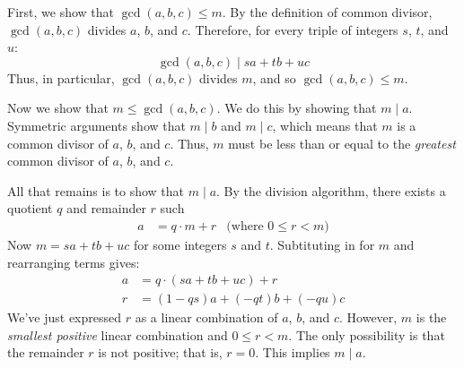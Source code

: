 \documentclass[12pt,twoside]{article}
\begin{document}
\begin{problem}{20}
{    First, we show that $\gcd(a, b, c) \leq m$.  By the definition of
    common divisor, $\gcd(a, b, c)$ divides $a$, $b$, and $c$.  Therefore,
    for every triple of integers $s$, $t$, and $u$:
    \[
    \gcd(a, b, c) \mid s a + t b + u c
    \]
    Thus, in particular, $\gcd(a, b, c)$ divides $m$, and so $\gcd(a, b,
    c) \leq m$.

    Now we show that $m \leq \gcd(a, b, c)$.  We do this by showing
    that $m \mid a$.  Symmetric arguments show that $m \mid b$
    and $m \mid c$, which means that $m$ is a common divisor of
    $a$, $b$, and $c$.  Thus, $m$ must be less than or equal to the
    \emph{greatest} common divisor of $a$, $b$, and $c$.

    All that remains is to show that $m \mid a$.  By the division
    algorithm, there exists a quotient $q$ and remainder $r$ such 
\begin{align*}
    a & = q \cdot m + r & \text{(where $0 \leq r < m$)}
\end{align*}
    Now $m = s a + t b + u c$ for some integers $s$ and $t$.  Subtituting
    in for $m$ and rearranging terms gives:
    \begin{align*}
    a & = q \cdot (s a + t b + u c) + r \\
    r & = (1 - qs) a + (-qt) b + (-qu) c
    \end{align*}
    We've just expressed $r$ as a linear combination of $a$, $b$, and $c$.
    However, $m$ is the \emph{smallest positive} linear combination and $0
    \leq r < m$.  The only possibility is that the remainder $r$ is not
    positive; that is, $r = 0$.  This implies $m \mid a$.
    
 }
  
\end{problem}
\end{document}
